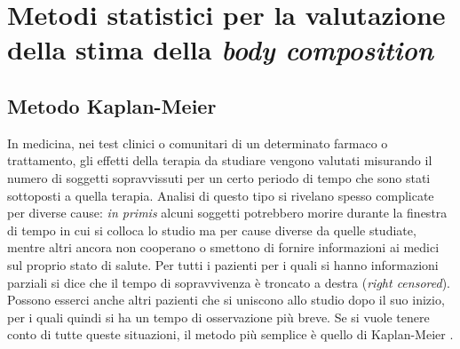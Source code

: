 \section{Metodi statistici per la valutazione della stima della \textit{body composition}}

\subsection{Metodo Kaplan-Meier}\label{km}
In medicina, nei test clinici o comunitari di un determinato farmaco o trattamento, gli effetti della terapia da studiare vengono valutati misurando il numero di soggetti sopravvissuti per un certo periodo di tempo che sono stati sottoposti a quella terapia. Analisi di questo tipo si rivelano spesso complicate per diverse cause: \textit{in primis} alcuni soggetti potrebbero morire durante la finestra di tempo in cui si colloca lo studio ma per cause diverse da quelle studiate, mentre altri ancora non cooperano o smettono di fornire informazioni ai medici sul proprio stato di salute. Per tutti i pazienti per i quali si hanno informazioni parziali si dice che il tempo di sopravvivenza è troncato a destra (\textit{right censored}). Possono esserci anche altri pazienti che si uniscono allo studio dopo il suo inizio, per i quali quindi si ha un tempo di osservazione più breve. Se si vuole tenere conto di tutte queste situazioni, il metodo più semplice è quello di Kaplan-Meier \cite{Goel2010}.

